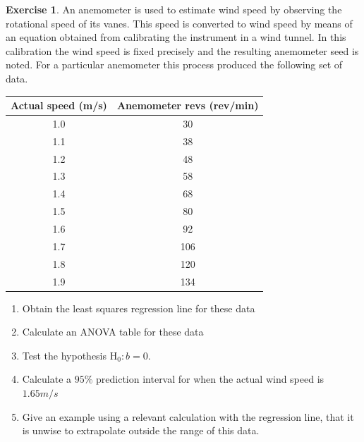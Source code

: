 \documentclass[
]{book}
\theoremstyle{definition}
\theoremstyle{definition}
\theoremstyle{definition}
\newtheorem{exercise}{Exercise}[chapter]
\theoremstyle{definition}
\theoremstyle{remark}
\begin{document}
\begin{exercise}

An anemometer is used to estimate wind speed by observing the rotational speed of its vanes. This speed is converted to wind speed by means of an equation obtained from calibrating the instrument in a wind tunnel. In this calibration the wind speed is fixed precisely and the resulting anemometer seed is noted. For a particular anemometer this process produced the following set of data.

\begin{longtable}[]{@{}cc@{}}
\toprule
Actual speed (m/s) & Anemometer revs (rev/min)\tabularnewline
\midrule
\endhead
1.0 & 30\tabularnewline
1.1 & 38\tabularnewline
1.2 & 48\tabularnewline
1.3 & 58\tabularnewline
1.4 & 68\tabularnewline
1.5 & 80\tabularnewline
1.6 & 92\tabularnewline
1.7 & 106\tabularnewline
1.8 & 120\tabularnewline
1.9 & 134\tabularnewline
\bottomrule
\end{longtable}

\begin{enumerate}
\def\labelenumi{\alph{enumi})}
\item
  Obtain the least squares regression line for these data
\item
  Calculate an ANOVA table for these data
\item
  Test the hypothesis \(\text{H}_0: b=0\).
\item
  Calculate a \(95\%\) prediction interval for when the actual wind speed is \(1.65 m/s\)
\item
  Give an example using a relevant calculation with the regression line, that it is unwise to extrapolate outside the range of this data.
\end{enumerate}

\end{exercise}
\end{document}
